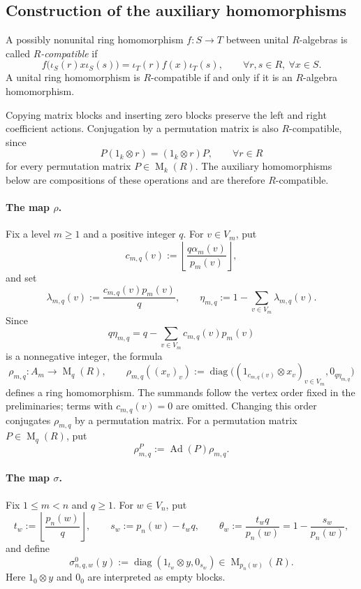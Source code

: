 \documentclass[11pt]{amsart}
\DeclareMathOperator{\Mat}{M}
\DeclareMathOperator{\diag}{diag}
\DeclareMathOperator{\Ad}{Ad}
\theoremstyle{definition}
\theoremstyle{remark}
\begin{document}
\subsection{Construction of the auxiliary homomorphisms}
\label{subsec:finite-matrix-models}

A possibly nonunital ring homomorphism $f\colon S\to T$ between
unital $R$-algebras is called \emph{$R$-compatible} if
\[
 f\bigl(\iota_S(r)x\iota_S(s)\bigr)
 =\iota_T(r)f(x)\iota_T(s),
 \qquad \forall r,s\in R,\ \forall x\in S.
\]
A unital ring homomorphism is $R$-compatible if and only if it is
an $R$-algebra homomorphism.

Copying matrix blocks and inserting zero blocks preserve the left and
right coefficient actions.  Conjugation by a permutation matrix is also
$R$-compatible, since
\[
 P(1_k\otimes r)=(1_k\otimes r)P,
 \qquad \forall r\in R
\]
for every permutation matrix $P\in\Mat_k(R)$.
The auxiliary homomorphisms below are compositions of these
operations and are therefore $R$-compatible.

\medskip
\paragraph{\textbf{The map $\rho$.}}
Fix a level $m\geq1$ and a positive integer $q$.
For $v\in V_m$, put
\[
 c_{m,q}(v)
 :=\left\lfloor\frac{q\alpha_m(v)}{p_m(v)}\right\rfloor,
\]
and set
\begin{equation}\label{eq:floor-c}
 \lambda_{m,q}(v)
 :=\frac{c_{m,q}(v)p_m(v)}q,
 \qquad
 \eta_{m,q}
 :=1-\sum_{v\in V_m}\lambda_{m,q}(v).
\end{equation}
Since
\[
 q\eta_{m,q}
 =q-\sum_{v\in V_m}c_{m,q}(v)p_m(v)
\]
is a nonnegative integer, the formula
\[
 \rho_{m,q}\colon A_m\longrightarrow \Mat_q(R),
 \qquad
 \rho_{m,q}((x_v)_v)
 :=\diag\bigl((1_{c_{m,q}(v)}\otimes x_v)_{v\in V_m},0_{q\eta_{m,q}}\bigr)
\]
defines a ring homomorphism.
The summands follow the vertex order fixed in the preliminaries; terms
with $c_{m,q}(v)=0$ are omitted.  Changing this order conjugates
$\rho_{m,q}$ by a permutation matrix.
For a permutation matrix $P\in\Mat_q(R)$, put
\[
 \rho_{m,q}^{P}:=\Ad(P)\rho_{m,q}.
\]

\medskip
\paragraph{\textbf{The map $\sigma$.}}
Fix $1\leq m<n$ and $q\geq1$.
For $w\in V_n$, put
\[
 t_w:=\left\lfloor\frac{p_n(w)}q\right\rfloor,
 \qquad
 s_w:=p_n(w)-t_wq,
 \qquad
 \theta_w:=\frac{t_wq}{p_n(w)}=1-\frac{s_w}{p_n(w)},
\]
and define
\[
 \sigma_{n,q,w}^0(y)
 :=\diag(1_{t_w}\otimes y,0_{s_w})
 \in\Mat_{p_n(w)}(R).
\]
Here $1_0\otimes y$ and $0_0$ are interpreted as empty blocks.
\end{document}
